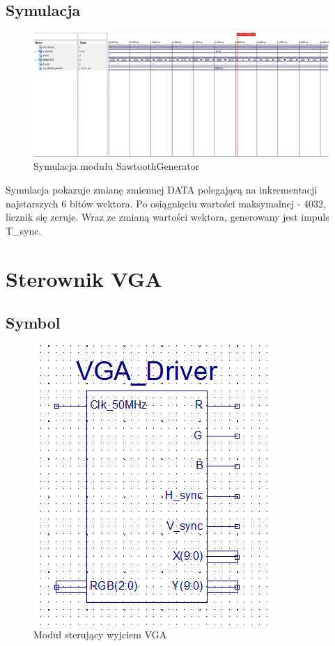 \documentclass[a4paper]{report}
\begin{document}
		\begin{landscape}
			\subsection{Symulacja}
				\begin{figure}[h!]
					\centering
					\includegraphics[width=1.6\textwidth]{sawtooth_generator_symulacja2.png}
					\caption{Symulacja modułu SawtoothGenerator}
				\end{figure}
\justify Symulacja pokazuje zmianę zmiennej DATA polegającą na inkrementacji najstarszych 6 bitów wektora. Po osiągnięciu wartości maksymalnej - 4032,\\ licznik się zeruje. Wraz ze zmianą wartości wektora, generowany jest impuls T\_sync.
		\end{landscape}
		
		\newpage
	\section{Sterownik VGA}
		\subsection{Symbol}
			\begin{figure}[h!]
				\centering
				\includegraphics{vgadriver2.png}
				\caption{Moduł sterujący wyjciem VGA}
			\end{figure}
\end{document}
